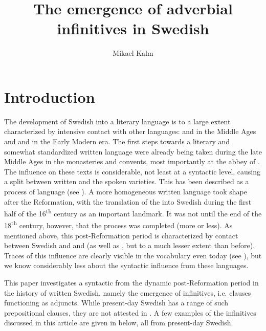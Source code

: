 \documentclass[output=paper]{langscibook}
\author{Mikael Kalm\affiliation{Stockholm University}}
\title{The emergence of adverbial infinitives in Swedish}
\begin{document}
\maketitle 



\section{Introduction}\label{sec:kalm:1}\largerpage
The development of Swedish into a literary language is to a large extent characterized by intensive contact with other languages:  and  in the Middle Ages and  and  in the Early Modern era. The first steps towards a literary and somewhat standardized written language were already being taken during the late Middle Ages in the monasteries and convents, most importantly at the abbey of . The  influence on these texts is considerable, not least at a syntactic level, causing a split between written  and the spoken varieties. This has been described as a process of language  (see \citealt{Hoder2009, Hoder2010}). A more homogeneous written language took shape after the Reformation, with the translation of the  into Swedish during the first half of the 16\textsuperscript{th} century as an important landmark. It was not until the end of the 18\textsuperscript{th} century, however, that the  process was completed (more or less). As mentioned above, this post-Reformation period is characterized by contact between Swedish and  and  (as well as , but to a much lesser extent than before). Traces of this influence are clearly visible in the vocabulary even today (see \citealt{Teleman2003Swedish,Teleman2003Tradis}), but we know considerably less about the syntactic influence from these languages. 



This paper investigates a syntactic  from the dynamic post-Ref\-or\-ma\-tion period in the history of written Swedish, namely the emergence of  infinitives, i.e.  clauses functioning as  adjuncts. While present-day Swedish has a range of such prepositional clauses, they are not attested in . A few examples of the  infinitives discussed in this article are given in  below, all from present-day Swedish.\largerpage  
\end{document}
